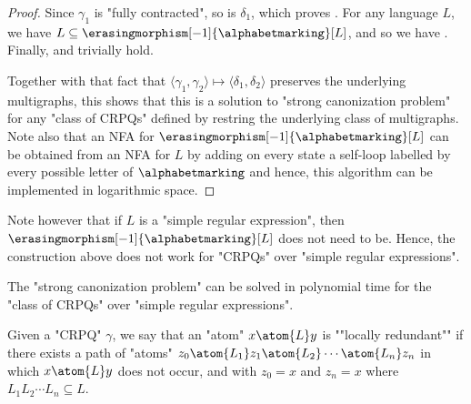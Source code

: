 \begin{proof}
	Since $\gamma_1$ is "fully contracted", so is $\delta_1$, which proves \axiomCanonContracted{}.
	For any language $L$, we have $L \subseteq \erasingmorphism[-1]{\alphabetmarking}[L]$, and so we have \axiomCanonContainment{}.
	Finally, \axiomCanonNonRed{} and \axiomCanonMarking{} trivially hold.
	
	Together with that fact that
	$\langle \gamma_1,\gamma_2 \rangle \mapsto \langle \delta_1, \delta_2\rangle$ preserves
	the underlying multigraphs, this shows that this is a solution to "strong canonization problem"
	for any "class of CRPQs" defined by restring the underlying class of multigraphs.
	Note also that an NFA for $\erasingmorphism[-1]{\alphabetmarking}[L]$ can be obtained
	from an NFA for $L$ by adding on every state a self-loop labelled by every possible letter of $\alphabetmarking$
	and hence, this algorithm can be implemented in logarithmic space.
\end{proof}

Note however that if $L$ is a "simple regular expression", then
$\erasingmorphism[-1]{\alphabetmarking}[L]$ does not need to be.
Hence, the construction above does not work for "CRPQs" over "simple regular expressions".

\begin{lemma}
	\AP\label{lem:canonization-SREs}
	The "strong canonization problem" can be solved in polynomial time
	for the "class of CRPQs" over "simple regular expressions".
\end{lemma}

Given a "CRPQ" $\gamma$, we say that an "atom" $x\atom{L} y$ is \AP""locally redundant"" if
there exists a path of "atoms" $z_0 \atom{L_1} z_1 \atom{L_2} \cdots \atom{L_n} z_n$
in which $x\atom{L} y$ does not occur, and with $z_0 = x$ and $z_n = x$
where $L_1 L_2\cdots L_n \subseteq L$.

